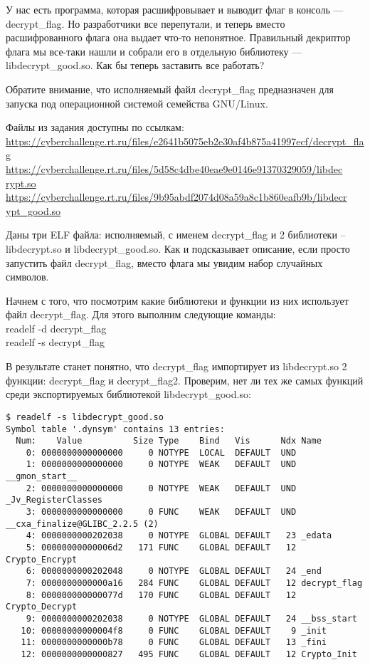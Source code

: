 
У нас есть программа, которая расшифровывает и выводит флаг в консоль — decrypt\_flag. Но разработчики все перепутали, и теперь вместо расшифрованного флага она выдает что-то непонятное. Правильный декриптор флага мы все-таки нашли и собрали его в отдельную библиотеку — libdecrypt\_good.so. Как бы теперь заставить все работать?

Обратите внимание, что исполняемый файл decrypt\_flag предназначен для запуска под операционной системой семейства GNU/Linux.

Файлы из задания доступны по ссылкам:\\
\url{https://cyberchallenge.rt.ru/files/e2641b5075eb2e30af4b875a41997ecf/decryp}\linebreak \url{t_flag}\\
\url{https://cyberchallenge.rt.ru/files/5d58c4dbe40eae9e0146e91370329059/libdec} \\ \url{rypt.so}\\
\url{https://cyberchallenge.rt.ru/files/9b95abdf2074d08a59a8c1b860eafb9b/libdecr}\\\url{ypt_good.so}

\solutionSection

Даны три ELF файла: исполняемый, с именем decrypt\_flag и 2 библиотеки – libdecrypt.so и libdecrypt\_good.so. Как и подсказывает описание, если просто запустить файл decrypt\_flag, вместо флага мы увидим набор случайных символов.

Начнем с того, что посмотрим какие библиотеки и функции из них использует файл decrypt\_flag. Для этого выполним следующие команды:\\
readelf -d decrypt\_flag\\
readelf -s decrypt\_flag

В результате станет понятно, что decrypt\_flag импортирует из libdecrypt.so 2 функции: decrypt\_flag и decrypt\_flag2. Проверим, нет ли тех же самых функций среди экспортируемых библиотекой libdecrypt\_good.so:\\
\begin{verbatim}
$ readelf -s libdecrypt_good.so
Symbol table '.dynsym' contains 13 entries:
  Num:    Value          Size Type    Bind   Vis      Ndx Name
    0: 0000000000000000     0 NOTYPE  LOCAL  DEFAULT  UND
    1: 0000000000000000     0 NOTYPE  WEAK   DEFAULT  UND __gmon_start__
    2: 0000000000000000     0 NOTYPE  WEAK   DEFAULT  UND _Jv_RegisterClasses
    3: 0000000000000000     0 FUNC    WEAK   DEFAULT  UND __cxa_finalize@GLIBC_2.2.5 (2)
    4: 0000000000202038     0 NOTYPE  GLOBAL DEFAULT   23 _edata
    5: 00000000000006d2   171 FUNC    GLOBAL DEFAULT   12 Crypto_Encrypt
    6: 0000000000202048     0 NOTYPE  GLOBAL DEFAULT   24 _end
    7: 0000000000000a16   284 FUNC    GLOBAL DEFAULT   12 decrypt_flag
    8: 000000000000077d   170 FUNC    GLOBAL DEFAULT   12 Crypto_Decrypt
    9: 0000000000202038     0 NOTYPE  GLOBAL DEFAULT   24 __bss_start
   10: 00000000000004f8     0 FUNC    GLOBAL DEFAULT    9 _init
   11: 0000000000000b78     0 FUNC    GLOBAL DEFAULT   13 _fini
   12: 0000000000000827   495 FUNC    GLOBAL DEFAULT   12 Crypto_Init
\end{verbatim}


